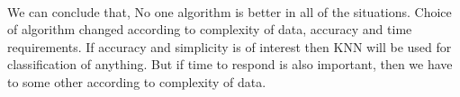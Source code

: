 \documentclass[]{report}
\begin{document}
\paragraph{} We can conclude that, No one algorithm is better in all of the situations. Choice of algorithm changed according to complexity of data, accuracy and time requirements. If accuracy and simplicity is of interest then KNN will be used for classification of anything. But if time to respond is also important, then we have to some other according to complexity of data.
\end{document}
